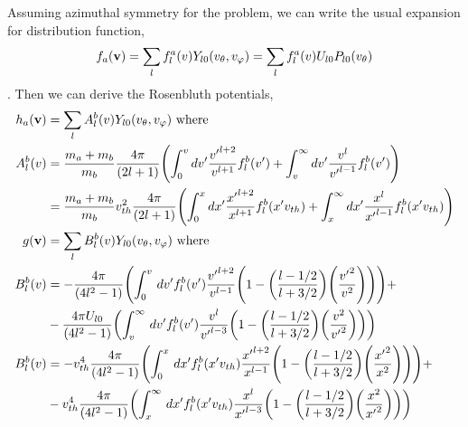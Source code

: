 \documentclass{article}[draft]
\begin{document}
Assuming azimuthal symmetry for the problem, we can write the usual expansion for distribution function, 
\begin{align*}
	f_a\of{\vect{v}} = \sum_{l} f^{a}_l\of{v} Y_{l0}\of{\vtheta, \vphi} = \sum_{l} f^{a}_l\of{v} U_{l0} P_{l0}\of{\vtheta}
\end{align*}. Then we can derive \cite{rosenbluth1957fokker} the Rosenbluth potentials, 
\begin{align*}
	h_a\of{\vect{v}} &= \sum_{l} A^{b}_l\of{v} Y_{l0}\of{\vtheta, \vphi} \text{ where } \\
	A^{b}_l\of{v} &= \frac{m_a + m_b}{m_b} \frac{4\pi}{(2l+1)}\of{\int_{0}^{v} dv^\prime \frac{{v^\prime}^{l+2}}{v^{l+1}} f^{b}_l\of{v^\prime} +  \int_{v}^{\infty} dv^\prime \frac{{v}^{l}}{{v^\prime}^{l-1}} f^{b}_l\of{v^\prime}}\\
	  &= \frac{m_a + m_b}{m_b} v_{th}^2 \frac{4\pi}{(2l+1)}\of{\int_{0}^{x} dx^\prime \frac{{x^\prime}^{l+2}}{x^{l+1}} f^{b}_l\of{x^\prime v_{th}} +  \int_{x}^{\infty} dx^\prime \frac{{x}^{l}}{{x^\prime}^{l-1}} f^{b}_l\of{x^\prime v_{th}}}\\	
	g\of{\vect{v}} & = \sum_{l} B^{b}_l\of{v} Y_{l0}\of{\vtheta, \vphi} \text{ where }\\
	B^{b}_{l}\of{v} & = -\frac{4\pi}{(4l^2-1)} \of
	{
		\int_{0}^{v} \diff{v^\prime} f^{b}_l\of{v^\prime} \frac{{v^\prime}^{l+2}}{v^{l-1}} \of{1 - \of{\frac{l-1/2}{l+3/2}}\of{\frac{{v^\prime}^2 }{v^2}}} } + \\
	&-\frac{4\pi U_{l0}}{(4l^2-1)} \of{
		\int_{v}^{\infty} \diff{v^\prime} f^{b}_l\of{v^\prime} \frac{{v}^{l}}{{v^\prime}^{l-3}} \of{1 - \of{\frac{l-1/2}{l+3/2}}\of{\frac{{v}^2 }{{v^\prime}^2}}}
	}\\
	B^{b}_{l}\of{v}  & = -v_{th}^4\frac{4\pi}{(4l^2-1)} \of
	{
		\int_{0}^{x} \diff{x^\prime} f^{b}_l\of{x^\prime v_{th}} \frac{{x^\prime}^{l+2}}{x^{l-1}} \of{1 - \of{\frac{l-1/2}{l+3/2}}\of{\frac{{x^\prime}^2 }{x^2}}} } + \\
	&-v_{th}^4 \frac{4\pi}{(4l^2-1)} \of{
		\int_{x}^{\infty} \diff{x^\prime} f^{b}_l\of{x^\prime v_{th}} \frac{{x}^{l}}{{x^\prime}^{l-3}} \of{1 - \of{\frac{l-1/2}{l+3/2}}\of{\frac{{x}^2 }{{x^\prime}^2}}}
	}
\end{align*}
\end{document}
